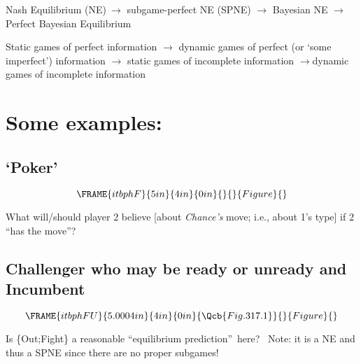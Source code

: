 \documentclass{article}
\begin{document}
Nash Equilibrium (NE)$\ \mathbf{\rightarrow }$ subgame-perfect NE (SPNE) $%
\mathbf{\rightarrow }$ Bayesian NE $\mathbf{\rightarrow }$ Perfect Bayesian
Equilibrium 

Static games of perfect information $\mathbf{\rightarrow }$ dynamic games of
perfect (or `some imperfect') information $\mathbf{\rightarrow }$ static
games of incomplete information $\mathbf{\rightarrow }$dynamic games of
incomplete information

\bigskip 

\section{Some examples:}

\subsection{\textbf{`Poker'}}

\[
\FRAME{itbphF}{5in}{4in}{0in}{}{}{Figure}{\special{language "Scientific
Word";type "GRAPHIC";maintain-aspect-ratio TRUE;display "USEDEF";valid_file
"T";width 5in;height 4in;depth 0in;original-width 4.6799in;original-height
3.584in;cropleft "0";croptop "1";cropright "1";cropbottom "0";tempfilename
'JSH9C61T.wmf';tempfile-properties "XPR";}} 
\]

What will/should player 2 believe [about \textit{Chance's }move; i.e., about
1's type] if 2 \textquotedblleft has the move\textquotedblright ?

\bigskip 

\subsection{Challenger who may be ready or unready and Incumbent}

\begin{equation}
\FRAME{itbphFU}{5.0004in}{4in}{0in}{\Qcb{Fig. 317.1}}{}{Figure}{\special%
{language "Scientific Word";type "GRAPHIC";maintain-aspect-ratio
TRUE;display "USEDEF";valid_file "T";width 5.0004in;height 4in;depth
0in;original-width 5.6886in;original-height 3.5201in;cropleft "0";croptop
"1";cropright "1";cropbottom "0";tempfilename
'JSH9C61U.wmf';tempfile-properties "XPR";}}
\end{equation}

Is \{Out;Fight\} a reasonable \textquotedblleft equilibrium
prediction\textquotedblright\ here? \ Note: it is a NE and thus a SPNE since
there are no proper subgames!
\end{document}
